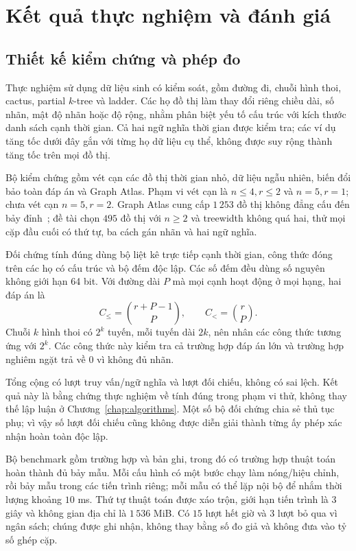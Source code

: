\chapter{Kết quả thực nghiệm và đánh giá}
\label{chap:results}

\section{Thiết kế kiểm chứng và phép đo}

Thực nghiệm sử dụng dữ liệu sinh có kiểm soát, gồm đường đi, chuỗi hình thoi, cactus, partial $k$-tree và ladder. Các họ đồ thị làm thay đổi riêng chiều dài, số nhãn, mật độ nhãn hoặc độ rộng, nhằm phân biệt yếu tố cấu trúc với kích thước danh sách cạnh thời gian. Cả hai ngữ nghĩa thời gian được kiểm tra; các ví dụ tăng tốc dưới đây gắn với từng họ dữ liệu cụ thể, không được suy rộng thành tăng tốc trên mọi đồ thị.

Bộ kiểm chứng gồm vét cạn các đồ thị thời gian nhỏ, dữ liệu ngẫu nhiên, biến đổi bảo toàn đáp án và Graph Atlas. Phạm vi vét cạn là $n\le4,r\le2$ và $n=5,r=1$; chưa vét cạn $n=5,r=2$. Graph Atlas cung cấp $1\,253$ đồ thị không đẳng cấu đến bảy đỉnh~\cite{atlas}; đề tài chọn $495$ đồ thị với $n\ge2$ và treewidth không quá hai, thử mọi cặp đầu cuối có thứ tự, ba cách gán nhãn và hai ngữ nghĩa.

Đối chứng tính đúng dùng bộ liệt kê trực tiếp cạnh thời gian, công thức đóng trên các họ có cấu trúc và bộ đếm độc lập. Các số đếm đều dùng số nguyên không giới hạn 64 bit. Với đường dài $P$ mà mọi cạnh hoạt động ở mọi hạng, hai đáp án là
\[
  C_{\le}=\binom{r+P-1}{P},\qquad C_{<}=\binom{r}{P}.
\]
Chuỗi $k$ hình thoi có $2^k$ tuyến, mỗi tuyến dài $2k$, nên nhân các công thức tương ứng với $2^k$. Các công thức này kiểm tra cả trường hợp đáp án lớn và trường hợp nghiêm ngặt trả về $0$ vì không đủ nhãn.



Tổng cộng có \QueryModeCases{} lượt truy vấn/ngữ nghĩa và \AuditComparisons{} lượt đối chiếu, không có sai lệch. Kết quả này là bằng chứng thực nghiệm về tính đúng trong phạm vi thử, không thay thế lập luận ở Chương~\ref{chap:algorithms}. Một số bộ đối chứng chia sẻ thủ tục phụ; vì vậy số lượt đối chiếu cũng không được diễn giải thành từng ấy phép xác nhận hoàn toàn độc lập.

Bộ benchmark gồm \BenchmarkCases{} trường hợp và \RawRows{} bản ghi, trong đó có \CompletedSolverCases{} trường hợp thuật toán hoàn thành đủ bảy mẫu. Mỗi cấu hình có một bước chạy làm nóng/hiệu chỉnh, rồi bảy mẫu trong các tiến trình riêng; mỗi mẫu có thể lặp nội bộ để nhắm thời lượng khoảng $10$ ms. Thứ tự thuật toán được xáo trộn, giới hạn tiến trình là $3$ giây và không gian địa chỉ là $1\,536$ MiB. Có $15$ lượt hết giờ và $3$ lượt bỏ qua vì ngân sách; chúng được ghi nhận, không thay bằng số đo giả và không đưa vào tỷ số ghép cặp.

